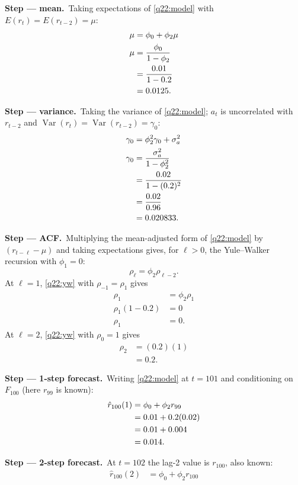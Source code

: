 \documentclass[11pt,a4paper]{article}
\newcommand{\passo}[2]{\par\smallskip\noindent\textbf{Step --- #1.}~#2}
\begin{document}
\begin{sol}
\passo{mean}{Taking expectations of \eqref{q22:model} with $E(r_t)=E(r_{t-2})=\mu$:}
\begin{align}
\mu &= \phi_0 + \phi_2\mu \label{q22:mu0}\\
\mu &= \frac{\phi_0}{1-\phi_2} \notag\\
&= \frac{0.01}{1-0.2} \notag\\
&= 0.0125. \notag
\end{align}
\passo{variance}{Taking the variance of \eqref{q22:model}; $a_t$ is uncorrelated with $r_{t-2}$ and $\operatorname{Var}(r_t)=\operatorname{Var}(r_{t-2})=\gamma_0$:}
\begin{align}
\gamma_0 &= \phi_2^2\gamma_0 + \sigma_a^2 \label{q22:g0}\\
\gamma_0 &= \frac{\sigma_a^2}{1-\phi_2^2} \notag\\
&= \frac{0.02}{1-(0.2)^2} \notag\\
&= \frac{0.02}{0.96} \notag\\
&= 0.020833. \notag
\end{align}
\passo{ACF}{Multiplying the mean-adjusted form of \eqref{q22:model} by $(r_{t-\ell}-\mu)$ and taking
expectations gives, for $\ell>0$, the Yule--Walker recursion with $\phi_1=0$:}
\begin{equation}\label{q22:yw} \rho_\ell = \phi_2\rho_{\ell-2}. \end{equation}
At $\ell=1$, \eqref{q22:yw} with $\rho_{-1}=\rho_1$ gives
\begin{align*}
\rho_1 &= \phi_2\rho_1\\
\rho_1(1-0.2) &= 0\\
\rho_1 &= 0.
\end{align*}
At $\ell=2$, \eqref{q22:yw} with $\rho_0=1$ gives
\begin{align*}
\rho_2 &= (0.2)(1)\\
&= 0.2.
\end{align*}
\passo{1-step forecast}{Writing \eqref{q22:model} at $t=101$ and conditioning on $F_{100}$ (here $r_{99}$ is known):}
\begin{align}
\hat r_{100}(1) &= \phi_0 + \phi_2 r_{99} \label{q22:f1}\\
&= 0.01 + 0.2(0.02) \notag\\
&= 0.01 + 0.004 \notag\\
&= 0.014. \notag
\end{align}
\passo{2-step forecast}{At $t=102$ the lag-2 value is $r_{100}$, also known:}
\begin{align}
\hat r_{100}(2) &= \phi_0 + \phi_2 r_{100} \label{q22:f2}\\

\end{align}
\end{sol}
\end{document}
